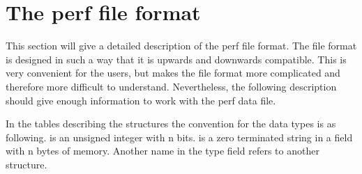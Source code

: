 \section{The perf file format}
This section will give a detailed description of the perf file format. The file format is designed in such a way that it is upwards and downwards compatible. This is very convenient for the users, but makes the file format more complicated and therefore more difficult to understand. Nevertheless, the following description should give enough information to work with the perf data file.

In the tables describing the structures the convention for the data types is as following.  is an unsigned integer with n bits.  is a zero terminated string in a field with n bytes of memory. Another name in the type field refers to another structure.


\FloatBarrier

\FloatBarrier
